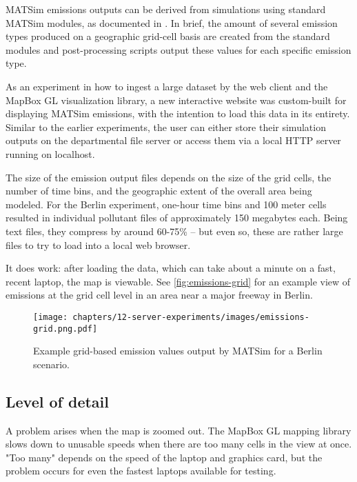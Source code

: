 MATSim emissions outputs can be derived from simulations using standard MATSim modules, as documented in \cite{Kickhoefer2015EmissionModeling}. In brief, the amount of several emission types produced on a geographic grid-cell basis are created from the standard modules and post-processing scripts output these values for each specific emission type.

As an experiment in how to ingest a large dataset by the web client and the MapBox GL visualization library, a new interactive website was custom-built for displaying MATSim emissions, with the intention to load this data in its entirety. Similar to the earlier experiments, the user can either store their simulation outputs on the departmental file server or access them via a local HTTP server running on localhost.

The size of the emission output files depends on the size of the grid cells, the number of time bins, and the geographic extent of the overall area being modeled. For the Berlin experiment, one-hour time bins and 100 meter cells resulted in individual pollutant files of approximately 150 megabytes each. Being text files, they compress by around 60-75\% -- but even so, these are rather large files to try to load into a local web browser.

It does work: after loading the data, which can take about a minute on a fast, recent laptop, the map is viewable. See \autoref{fig:emissions-grid} for an example view of emissions at the grid cell level in an area near a major freeway in Berlin.

\begin{figure}[!ht]
  \texttt{[image: chapters/12-server-experiments/images/emissions-grid.png.pdf]}
  \caption{Example grid-based emission values output by MATSim for a Berlin scenario.}
  \label{fig:emissions-grid}
\end{figure}

\hypertarget{server-experiments-emissions-lod}{%
\subsection{Level of detail}
\label{server-experiments-emissions-lod}}

A problem arises when the map is zoomed out. The MapBox GL mapping library slows down to unusable speeds when there are too many cells in the view at once. "Too many" depends on the speed of the laptop and graphics card, but the problem occurs for even the fastest laptops available for testing.

